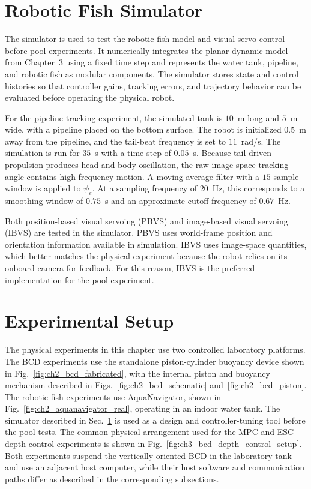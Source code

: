 \documentclass{uhcoethesis}
\begin{document}
\section{Robotic Fish Simulator}
\label{sec:ch3_robotic_fish_simulator}

The simulator is used to test the robotic-fish model and visual-servo control before pool experiments. It numerically integrates the planar dynamic model from Chapter~3 using a fixed time step and represents the water tank, pipeline, and robotic fish as modular components. The simulator stores state and control histories so that controller gains, tracking errors, and trajectory behavior can be evaluated before operating the physical robot.

For the pipeline-tracking experiment, the simulated tank is $10$~m long and $5$~m wide, with a pipeline placed on the bottom surface. The robot is initialized $0.5$~m away from the pipeline, and the tail-beat frequency is set to $11$~rad/s. The simulation is run for $35$~s with a time step of $0.05$~s. Because tail-driven propulsion produces head and body oscillation, the raw image-space tracking angle contains high-frequency motion. A moving-average filter with a $15$-sample window is applied to $\psi_e$. At a sampling frequency of $20$~Hz, this corresponds to a smoothing window of $0.75$~s and an approximate cutoff frequency of $0.67$~Hz.

Both position-based visual servoing (PBVS) and image-based visual servoing (IBVS) are tested in the simulator. PBVS uses world-frame position and orientation information available in simulation. IBVS uses image-space quantities, which better matches the physical experiment because the robot relies on its onboard camera for feedback. For this reason, IBVS is the preferred implementation for the pool experiment.

\section{Experimental Setup}
\label{sec:ch3_experimental_setup}

The physical experiments in this chapter use two controlled laboratory platforms. The BCD experiments use the standalone piston-cylinder buoyancy device shown in Fig.~\ref{fig:ch2_bcd_fabricated}, with the internal piston and buoyancy mechanism described in Figs.~\ref{fig:ch2_bcd_schematic} and~\ref{fig:ch2_bcd_piston}. The robotic-fish experiments use AquaNavigator, shown in Fig.~\ref{fig:ch2_aquanavigator_real}, operating in an indoor water tank. The simulator described in Sec.~\ref{sec:ch3_robotic_fish_simulator} is used as a design and controller-tuning tool before the pool tests. The common physical arrangement used for the MPC and ESC depth-control experiments is shown in Fig.~\ref{fig:ch3_bcd_depth_control_setup}. Both experiments suspend the vertically oriented BCD in the laboratory tank and use an adjacent host computer, while their host software and communication paths differ as described in the corresponding subsections.
\end{document}
